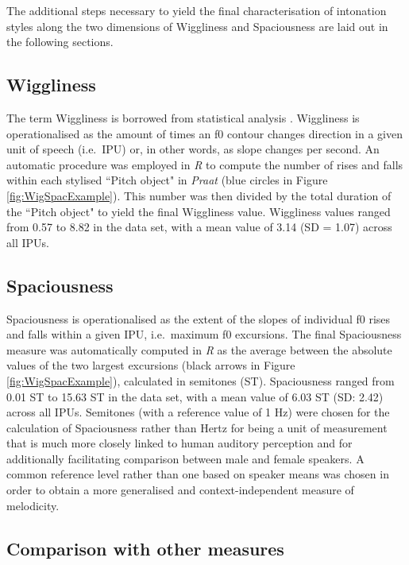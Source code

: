 The additional steps necessary to yield the final characterisation of intonation styles along the two dimensions of Wiggliness and Spaciousness are laid out in the following sections.

	\subsection{Wiggliness}\label{int_analysis_wiggliness}

The term Wiggliness is borrowed from statistical analysis \citep[see, for instance,][]{hallLocalMinimaCrossValidation1991}. Wiggliness is operationalised as the amount of times an f0 contour changes direction in a given unit of speech (i.e.~IPU) or, in other words, as slope changes per second. An automatic procedure was employed in \emph{R} to compute the number of rises and falls within each stylised ``Pitch object" in \textit{Praat} (blue circles in Figure \ref{fig:WigSpacExample}). This number was then divided by the total duration of the ``Pitch object" to yield the final Wiggliness value. Wiggliness values ranged from 0.57 to 8.82 in the data set, with a mean value of 3.14 (SD = 1.07) across all IPUs.

    	\subsection{Spaciousness}\label{sec:int_analysis_spaciousness}

Spaciousness is operationalised as the extent of the slopes of individual f0 rises and falls within a given IPU, i.e.~maximum f0 excursions. The final Spaciousness measure was automatically computed in \emph{R} as the average between the absolute values of the two largest excursions (black arrows in Figure \ref{fig:WigSpacExample}), calculated in semitones (ST). Spaciousness ranged from 0.01 ST to 15.63 ST in the data set, with a mean value of 6.03 ST (SD: 2.42) across all IPUs. Semitones (with a reference value of 1 Hz) were chosen for the calculation of Spaciousness rather than Hertz \citep[originally used in][]{wehrleSomewhereSpectrumRobotic2018} for being a unit of measurement that is much more closely linked to human auditory perception \citep{nolanIntonationalEquivalenceExperimental2003} and for additionally facilitating comparison between male and female speakers. A common reference level rather than one based on speaker means was chosen in order to obtain a more generalised and context-independent measure of melodicity.

	\subsection{Comparison with other measures}\label{int_analysis_comparison}

